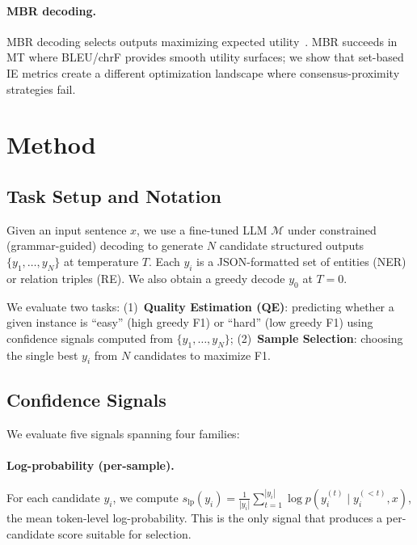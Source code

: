 \documentclass[11pt,a4paper]{article}
\begin{document}
\paragraph{MBR decoding.}
MBR decoding selects outputs maximizing expected utility~\cite{eikema2022sampling}. MBR succeeds in MT where BLEU/chrF provides smooth utility surfaces; we show that set-based IE metrics create a different optimization landscape where consensus-proximity strategies fail.

\section{Method}

\subsection{Task Setup and Notation}

Given an input sentence $x$, we use a fine-tuned LLM $\mathcal{M}$ under constrained (grammar-guided) decoding to generate $N$ candidate structured outputs $\{y_1, \ldots, y_N\}$ at temperature $T$. Each $y_i$ is a JSON-formatted set of entities (NER) or relation triples (RE). We also obtain a greedy decode $y_0$ at $T{=}0$.

We evaluate two tasks: (1)~\textbf{Quality Estimation (QE)}: predicting whether a given instance is ``easy'' (high greedy F1) or ``hard'' (low greedy F1) using confidence signals computed from $\{y_1, \ldots, y_N\}$; (2)~\textbf{Sample Selection}: choosing the single best $y_i$ from $N$ candidates to maximize F1.

\subsection{Confidence Signals}

We evaluate five signals spanning four families:

\paragraph{Log-probability (per-sample).} For each candidate $y_i$, we compute $s_\text{lp}(y_i) = \frac{1}{|y_i|}\sum_{t=1}^{|y_i|} \log p(y_i^{(t)} \mid y_i^{(<t)}, x)$, the mean token-level log-probability. This is the only signal that produces a per-candidate score suitable for selection.
\end{document}
